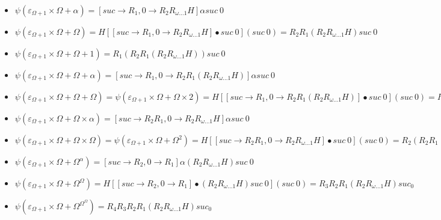 \documentclass[10pt]{article}
\begin{document}
\begin{itemize}
\item \( \psi(\varepsilon_{\Omega+1} \times \Omega+\alpha) = [suc \rightarrow R_1, 0 \rightarrow R_2 R_{\omega \ldots 1} H] \alpha suc\ 0 \)

\item \( \psi(\varepsilon_{\Omega+1} \times \Omega+\Omega) = H [[suc \rightarrow R_1, 0 \rightarrow R_2 R_{\omega \ldots 1} H] \bullet suc\ 0] (suc\ 0) = R_2 R_1 (R_2 R_{\omega \ldots 1} H) suc\ 0 \)

\item \( \psi(\varepsilon_{\Omega+1} \times \Omega+\Omega+1) = R_1 (R_2 R_1 (R_2 R_{\omega \ldots 1} H)) suc\ 0 \)

\item \( \psi(\varepsilon_{\Omega+1} \times \Omega+\Omega+\alpha) = [suc \rightarrow R_1, 0 \rightarrow R_2 R_1 (R_2 R_{\omega \ldots 1} H)] \alpha suc\ 0 \)

\item \( \psi(\varepsilon_{\Omega+1} \times \Omega+\Omega+\Omega) = \psi(\varepsilon_{\Omega+1} \times \Omega+\Omega \times 2) = H [[suc \rightarrow R_1, 0 \rightarrow R_2 R_1 (R_2 R_{\omega \ldots 1} H)] \bullet suc\ 0] (suc\ 0) = R_2 R_1 (R_2 R_1 (R_2 R_{\omega \ldots 1} H)) suc\ 0 \)

\item \( \psi(\varepsilon_{\Omega+1} \times \Omega+\Omega \times \alpha) = [suc \rightarrow R_2 R_1, 0 \rightarrow R_2 R_{\omega \ldots 1} H] \alpha suc\ 0 \)

\item \( \psi(\varepsilon_{\Omega+1} \times \Omega+\Omega \times \Omega) = \psi(\varepsilon_{\Omega+1} \times \Omega+\Omega^2) = H [[suc \rightarrow R_2 R_1, 0 \rightarrow R_2 R_{\omega \ldots 1} H] \bullet suc\ 0] (suc\ 0) = R_2 (R_2 R_1) (R_2 R_{\omega \ldots 1} H) suc\ 0 \)

\item \( \psi(\varepsilon_{\Omega+1} \times \Omega+\Omega^\alpha) = [suc \rightarrow R_2, 0 \rightarrow R_1] \alpha (R_2 R_{\omega \ldots 1} H) suc\ 0 \)

\item \( \psi(\varepsilon_{\Omega+1} \times \Omega+\Omega^\Omega) = H [[suc \rightarrow R_2, 0 \rightarrow R_1] \bullet (R_2 R_{\omega \ldots 1} H) suc\ 0] (suc\ 0) = R_3 R_2 R_1 (R_2 R_{\omega \ldots 1} H) suc_ 0 \)

\item \( \psi(\varepsilon_{\Omega+1} \times \Omega+\Omega^{\Omega^\Omega}) = R_4 R_3 R_2 R_1 (R_2 R_{\omega \ldots 1} H) suc_ 0 \)


\end{itemize}
\end{document}
